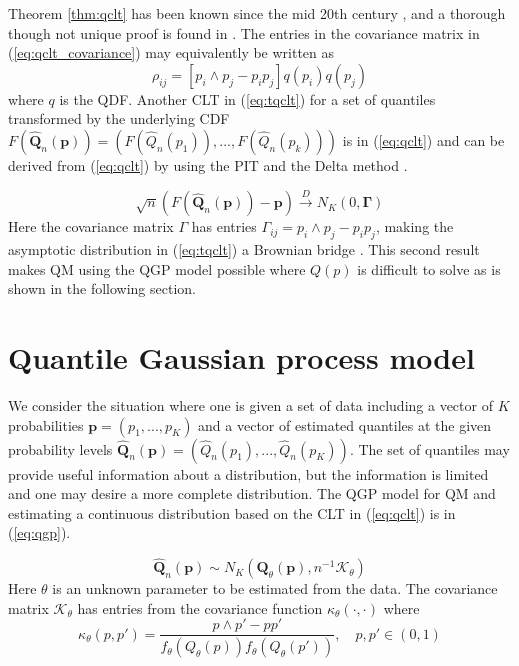 \documentclass[preprint,12pt,authoryear]{elsarticle}
\newcommand{\1}[1]{\mathds{1}\left[#1\right]}
\begin{document}
Theorem \ref{thm:qclt} has been known since the mid 20th century 
\cite[]{cramer1951mathematical}, and a thorough though not unique proof is 
found in \cite{walker1968note}. The entries in the covariance matrix in 
(\ref{eq:qclt_covariance}) may equivalently be written as
\begin{equation}
    \rho_{ij} = [p_i \wedge p_j - p_i p_j]q(p_i)q(p_j)
    \label{eq:qgp_simp_cov}
\end{equation}
where $q$ is the QDF. Another CLT in (\ref{eq:tqclt}) for a set of quantiles 
transformed by the underlying CDF $F(\hat{\boldsymbol{Q}}_n(\boldsymbol{p})) = 
(F(\hat{Q}_n(p_1)), ..., F(\hat{Q}_n(p_k)))$ is in (\ref{eq:qclt}) and can be 
derived from (\ref{eq:qclt}) by using the PIT and the Delta method 
\cite[]{parzen2004quantile}.

\begin{equation}
    \label{eq:tqclt}
    \sqrt{n}(F(\hat{\boldsymbol{Q}}_n(\boldsymbol{p})) - \boldsymbol{p}) 
    \overset{D}{\rightarrow} N_K(0, \boldsymbol{\Gamma})
\end{equation}
Here the covariance matrix $\Gamma$ has entries $\Gamma_{ij} = p_i \wedge p_j - 
p_i p_j$, making the asymptotic distribution in (\ref{eq:tqclt}) a 
Brownian bridge \cite[]{chow2009brownian}. This second result makes QM using 
the QGP model possible where $Q(p)$ is difficult to solve as is shown in the 
following section.




\section{Quantile Gaussian process model} \label{sec:qgp_model}

We consider the situation where one is given a set of data including a vector 
of $K$ probabilities $\boldsymbol{p} = (p_1, ..., p_K)$ and a vector of 
estimated quantiles at the given probability levels 
$\hat{\boldsymbol{Q}}_n(\boldsymbol{p}) = (\hat{Q}_n(p_1), ..., \hat{Q}_n(p_K))$. 
The set of quantiles may provide useful information about a distribution, but 
the information is limited and one may desire a more complete distribution.
The QGP model for QM and estimating a continuous distribution based on the CLT 
in (\ref{eq:qclt}) is in (\ref{eq:qgp}).



\begin{equation}
    \label{eq:qgp}
\hat{\boldsymbol{Q}}_n(\boldsymbol{p}) \sim N_K(\boldsymbol{Q}_{\theta}(\boldsymbol{p}), n^{-1} \boldsymbol{\mathcal{K}}_{\theta})
\end{equation}
Here $\theta$ is an unknown parameter to be estimated from the data. The 
covariance matrix $\boldsymbol{\mathcal{K}}_{\theta}$ has entries from the 
covariance function $\kappa_{\theta}(\cdot, \cdot)$ where 
\[
\kappa_{\theta}(p, p') = \frac{p\wedge p' - p p'}{f_{\theta}(Q_{\theta}(p)) f_{\theta}(Q_{\theta}(p'))}, \quad p, p' \in (0,1)
\]
\end{document}
